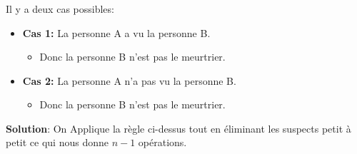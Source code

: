 \begin{frame}
    \frametitle{\problemtitle}
    Il y a deux cas possibles:
    \begin{itemize}
        \item<+-> \textbf{Cas 1:} La personne A a vu la personne B.
            \begin{itemize}
                \item<+-> Donc la personne B n'est pas le meurtrier.
            \end{itemize}
        \item<+-> \textbf{Cas 2:} La personne A n'a pas vu la personne B.
            \begin{itemize}
                \item<+-> Donc la personne B n'est pas le meurtrier.
            \end{itemize}
    \end{itemize}
    \pause
    \textbf{Solution}: On Applique la règle ci-dessus tout en éliminant les suspects petit à petit ce qui nous donne $n-1$ opérations. 
\end{frame}

